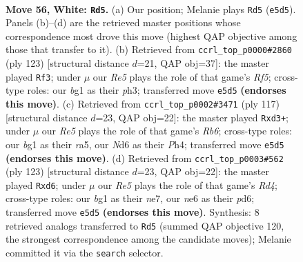 \documentclass[11pt]{article}
\begin{document}
\clearpage

\begin{figure}[p]\centering
\begin{subfigure}{0.46\textwidth}\centering
\resizebox{\linewidth}{!}{%
\newchessgame
\chessboard[
  setfen={8/4k3/3Nn3/4R1P1/P7/7r/8/4K1b1 w - - 2 56},
  showmover=false,
  pgfstyle=straightmove, color=movearrow, markmove={e5-d5}
]}
\caption{}
\end{subfigure}\hfill
\begin{subfigure}{0.46\textwidth}\centering
\resizebox{\linewidth}{!}{%
\newchessgame
\chessboard[
  setfen={3R4/8/4k3/8/3p1rN1/2n4P/3K4/8 b - - 0 62},
  showmover=false,
  pgfstyle=straightmove, color=movearrow, markmove={f4-f3}
]}
\caption{}
\end{subfigure}
\\[4pt]
\begin{subfigure}{0.46\textwidth}\centering
\resizebox{\linewidth}{!}{%
\newchessgame
\chessboard[
  setfen={8/8/3k4/R7/7p/pr1N1K2/6P1/8 b - - 2 59},
  showmover=false,
  pgfstyle=straightmove, color=movearrow, markmove={b3-d3}
]}
\caption{}
\end{subfigure}\hfill
\begin{subfigure}{0.46\textwidth}\centering
\resizebox{\linewidth}{!}{%
\newchessgame
\chessboard[
  setfen={8/4N3/3P3k/1pNrp3/8/8/8/4K3 b - - 5 62},
  showmover=false,
  pgfstyle=straightmove, color=movearrow, markmove={d5-d6}
]}
\caption{}
\end{subfigure}
\caption{\textbf{Move 56, White: \texttt{Rd5}.} (a) Our position; Melanie plays \texttt{Rd5} (\texttt{e5d5}). Panels (b)--(d) are the retrieved master positions whose correspondence most drove this move (highest QAP objective among those that transfer to it). (b) Retrieved from \texttt{ccrl\_top\_p0000\#2860} (ply 123) [structural distance $d$=21, QAP obj=37]: the master played \texttt{Rf3}; under $\mu$ our \emph{Re5} plays the role of that game's \emph{Rf5}; cross-type roles: our \emph{b}g1 as their \emph{p}h3; transferred move \texttt{e5d5} \textbf{(endorses this move)}. (c) Retrieved from \texttt{ccrl\_top\_p0002\#3471} (ply 117) [structural distance $d$=23, QAP obj=22]: the master played \texttt{Rxd3+}; under $\mu$ our \emph{Re5} plays the role of that game's \emph{Rb6}; cross-type roles: our \emph{b}g1 as their \emph{r}a5, our \emph{N}d6 as their \emph{P}h4; transferred move \texttt{e5d5} \textbf{(endorses this move)}. (d) Retrieved from \texttt{ccrl\_top\_p0003\#562} (ply 123) [structural distance $d$=23, QAP obj=22]: the master played \texttt{Rxd6}; under $\mu$ our \emph{Re5} plays the role of that game's \emph{Rd4}; cross-type roles: our \emph{b}g1 as their \emph{n}e7, our \emph{n}e6 as their \emph{p}d6; transferred move \texttt{e5d5} \textbf{(endorses this move)}. Synthesis: 8 retrieved analogs transferred to \texttt{Rd5} (summed QAP objective 120, the strongest correspondence among the candidate moves); Melanie committed it via the \texttt{search} selector.}
\label{fig:thought-m110}
\end{figure}
\end{document}
